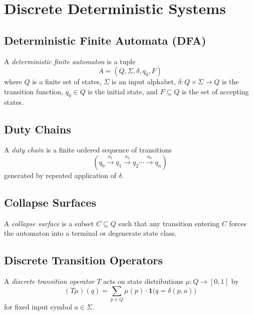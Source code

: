 
\section{Discrete Deterministic Systems}

\subsection{Deterministic Finite Automata (DFA)}
\begin{definition}
A \emph{deterministic finite automaton} is a tuple
\[
A = (Q, \Sigma, \delta, q_0, F)
\]
where $Q$ is a finite set of states, $\Sigma$ is an input alphabet,
$\delta : Q \times \Sigma \to Q$ is the transition function,
$q_0 \in Q$ is the initial state, and $F \subseteq Q$ is the set of
accepting states.
\end{definition}


\subsection{Duty Chains}
\begin{definition}
A \emph{duty chain} is a finite ordered sequence of transitions
\[
(q_0 \xrightarrow{a_1} q_1 \xrightarrow{a_2} q_2 \cdots
\xrightarrow{a_n} q_n)
\]
generated by repeated application of $\delta$.
\end{definition}


\subsection{Collapse Surfaces}
\begin{definition}
A \emph{collapse surface} is a subset $C \subseteq Q$ such that any
transition entering $C$ forces the automaton into a terminal or
degenerate state class.
\end{definition}


\subsection{Discrete Transition Operators}
\begin{definition}
A \emph{discrete transition operator} $T$ acts on state distributions
$\mu : Q \to [0,1]$ by
\[
(T\mu)(q) = \sum_{p \in Q} \mu(p) \cdot \mathbf{1}\big(q = \delta(p,a)\big)
\]
for fixed input symbol $a \in \Sigma$.
\end{definition}

